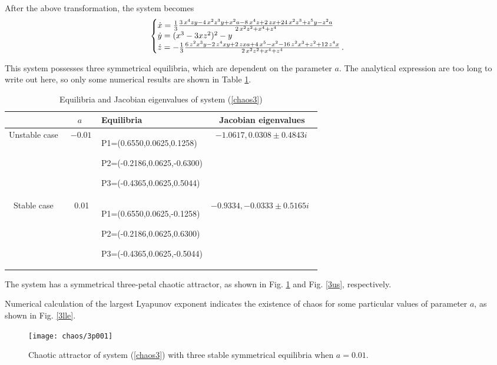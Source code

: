 After the above transformation, the system becomes
\begin{equation}\hspace{-20pt}\label{chaos3}
\left\{\hspace{-5pt}
\begin{array}{l}
\dot{x}=\frac{1}{3}{\frac
{3\,{x}^{4}zy-4\,{x}^{2}{z}^{3}y+{x}^{2}a-8\,{x}^{4}z+2\,z
x+24\,{x}^{2}{z}^{3}+{z}^{5}y-{z}^{2}a}{2\,{x}^{2}{z}^{2}+{x}^{4}+{z}^
{4}}} \\
\dot{y}=(x^3-3xz^2)^2-y \\
\dot{z}=-\frac{1}{3}{\frac
{6\,{z}^{2}{x}^{3}y-2\,{z}^{4}xy+2\,zxa+4\,{x}^{5}-{x}^{2}-16\,
{z}^{2}{x}^{3}+{z}^{2}+12\,{z}^{4}x}{2\,{x}^{2}{z}^{2}+{x}^{4}+{z}^{4}}}\,.
\end{array}
\right.
\end{equation}\label{eq3}

This system possesses three symmetrical equilibria, which are
dependent on the parameter $a$. The analytical expression are too
long to write out here, so only some numerical results are shown in Table \ref{3e}.

\begin{table}[htbp]\caption{Equilibria and Jacobian eigenvalues of system (\ref{chaos3})}
  \centering
\begin{tabular}{|c|c|p{150pt}|c|}
\hline & $a$ & Equilibria &
Jacobian eigenvalues \\
\hline Unstable case & 
\, $-0.01$\, & P1=(0.6550,0.0625,0.1258) \par
P2=(-0.2186,0.0625,-0.6300) \par P3=(-0.4365,0.0625,0.5044)&
$-1.0617,0.0308\pm 0.4843i$\, \\
\hline Stable case & 
\, 0.01 & P1=(0.6550,0.0625,-0.1258) \par
P2=(-0.2186,0.0625,0.6300) \par P3=(-0.4365,0.0625,-0.5044) & $-0.9334,-0.0333\pm 0.5165i$ \, \\
\hline
\end{tabular}
\label{3e}
\end{table}

The system has a symmetrical three-petal chaotic attractor, as shown in Fig. \ref{3s} and Fig. \ref{3us}, respectively. 

Numerical calculation of the largest Lyapunov exponent indicates the existence of chaos for some particular values of parameter $a$, as shown in Fig. \ref{3lle}.

\begin{figure}
\centering
\texttt{[image: chaos/3p001]}
\caption{Chaotic attractor of system (\ref{chaos3}) with three stable symmetrical equilibria when $a=0.01$.}\label{3s}
\end{figure}

